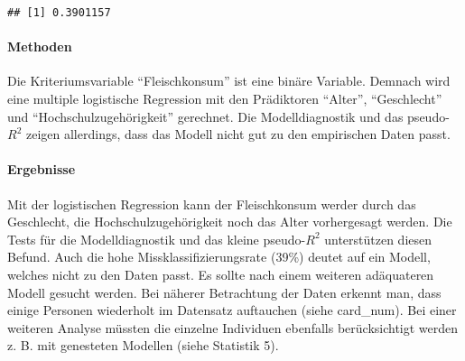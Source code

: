 \documentclass[]{article}
\newenvironment{Shaded}{\begin{snugshade}}{\end{snugshade}}
\newcommand{\KeywordTok}[1]{\textcolor[rgb]{0.13,0.29,0.53}{\textbf{#1}}}
\newcommand{\DecValTok}[1]{\textcolor[rgb]{0.00,0.00,0.81}{#1}}
\newcommand{\StringTok}[1]{\textcolor[rgb]{0.31,0.60,0.02}{#1}}
\newcommand{\CommentTok}[1]{\textcolor[rgb]{0.56,0.35,0.01}{\textit{#1}}}
\newcommand{\OperatorTok}[1]{\textcolor[rgb]{0.81,0.36,0.00}{\textbf{#1}}}
\newcommand{\NormalTok}[1]{#1}
\let\oldparagraph\paragraph
\renewcommand{\paragraph}[1]{\oldparagraph{#1}\mbox{}}
\begin{document}
\begin{Shaded}
\end{Shaded}

\begin{verbatim}
## [1] 0.3901157
\end{verbatim}

\paragraph{Methoden}\label{methoden}

Die Kriteriumsvariable ``Fleischkonsum'' ist eine binäre Variable.
Demnach wird eine multiple logistische Regression mit den Prädiktoren
``Alter'', ``Geschlecht'' und ``Hochschulzugehörigkeit'' gerechnet. Die
Modelldiagnostik und das pseudo-\(R^2\) zeigen allerdings, dass das
Modell nicht gut zu den empirischen Daten passt.

\paragraph{Ergebnisse}\label{ergebnisse}

Mit der logistischen Regression kann der Fleischkonsum werder durch das
Geschlecht, die Hochschulzugehörigkeit noch das Alter vorhergesagt
werden. Die Tests für die Modelldiagnostik und das kleine pseudo-\(R^2\)
unterstützen diesen Befund. Auch die hohe Missklassifizierungsrate
(39\%) deutet auf ein Modell, welches nicht zu den Daten passt. Es
sollte nach einem weiteren adäquateren Modell gesucht werden. Bei
näherer Betrachtung der Daten erkennt man, dass einige Personen
wiederholt im Datensatz auftauchen (siehe card\_num). Bei einer weiteren
Analyse müssten die einzelne Individuen ebenfalls berücksichtigt werden
z. B. mit genesteten Modellen (siehe Statistik 5).
\end{document}

